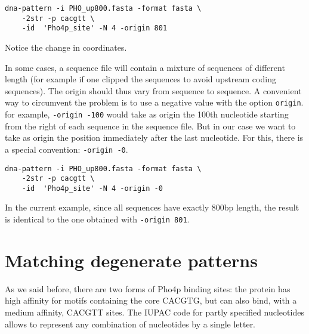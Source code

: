 {\color{Blue} \begin{footnotesize} 
\begin{verbatim}
dna-pattern -i PHO_up800.fasta -format fasta \
    -2str -p cacgtt \
    -id  'Pho4p_site' -N 4 -origin 801
\end{verbatim} \end{footnotesize}
}

Notice the change in coordinates.

In some cases, a sequence file will contain a mixture of sequences of
different length (for example if one clipped the sequences to avoid
upstream coding sequences). The origin should thus vary from sequence
to sequence. A convenient way to circumvent the problem is to use a
negative value with the option \texttt{origin}. for example,
\texttt{-origin -100} would take as origin the 100th nucleotide
starting from the right of each sequence in the sequence file. But in
our case we want to take as origin the position immediately after the
last nucleotide. For this, there is a special convention: \texttt{-origin
-0}.

{\color{Blue} \begin{footnotesize} 
\begin{verbatim}
dna-pattern -i PHO_up800.fasta -format fasta \
    -2str -p cacgtt \
    -id  'Pho4p_site' -N 4 -origin -0
\end{verbatim} \end{footnotesize}
}

In the current example, since all sequences have exactly 800bp length,
the result is identical to the one obtained with \texttt{-origin 801}.

\section{Matching degenerate patterns}

As we said before, there are two forms of Pho4p binding sites: the
protein has high affinity for motifs containing the core CACGTG, but
can also bind, with a medium affinity, CACGTT sites. The IUPAC code
for partly specified nucleotides allows to represent any combination
of nucleotides by a single letter.

